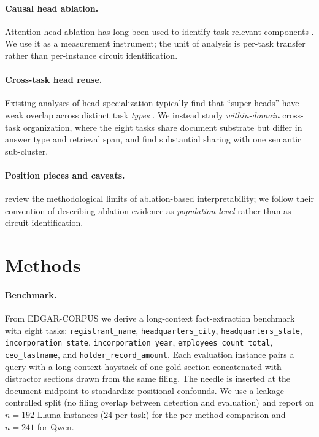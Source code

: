 \documentclass{article}
\newcommand{\taskpill}[1]{\colorbox{gray!15}{\texttt{\small #1}}}
\theoremstyle{plain}
\theoremstyle{definition}
\theoremstyle{remark}
\begin{document}
\paragraph{Causal head ablation.} Attention head ablation has long been used to identify task-relevant components \citep{voita2019heads,michel2019heads,wang2022interpretability,olsson2022induction}. We use it as a measurement instrument; the unit of analysis is per-task transfer rather than per-instance circuit identification.

\paragraph{Cross-task head reuse.} Existing analyses of head specialization typically find that ``super-heads'' have weak overlap across distinct task \emph{types} \citep{chowdhary2025kmshc}. We instead study \emph{within-domain} cross-task organization, where the eight tasks share document substrate but differ in answer type and retrieval span, and find substantial sharing with one semantic sub-cluster.

\paragraph{Position pieces and caveats.} \citet{sharkey2025openproblems} review the methodological limits of ablation-based interpretability; we follow their convention of describing ablation evidence as \emph{population-level} rather than as circuit identification.

\section{Methods}
\label{sec:methods}

\paragraph{Benchmark.} From EDGAR-CORPUS \citep{loukas2021edgar} we derive a long-context fact-extraction benchmark with eight tasks: \taskpill{registrant\_name}, \taskpill{headquarters\_city}, \taskpill{headquarters\_state}, \taskpill{incorporation\_state}, \taskpill{incorporation\_year}, \taskpill{employees\_count\_total}, \taskpill{ceo\_lastname}, and \taskpill{holder\_record\_amount}. Each evaluation instance pairs a query with a long-context haystack of one gold section concatenated with distractor sections drawn from the same filing. The needle is inserted at the document midpoint to standardize positional confounds. We use a leakage-controlled split (no filing overlap between detection and evaluation) and report on $n{=}192$ Llama instances ($24$ per task) for the per-method comparison and $n{=}241$ for Qwen.
\end{document}
